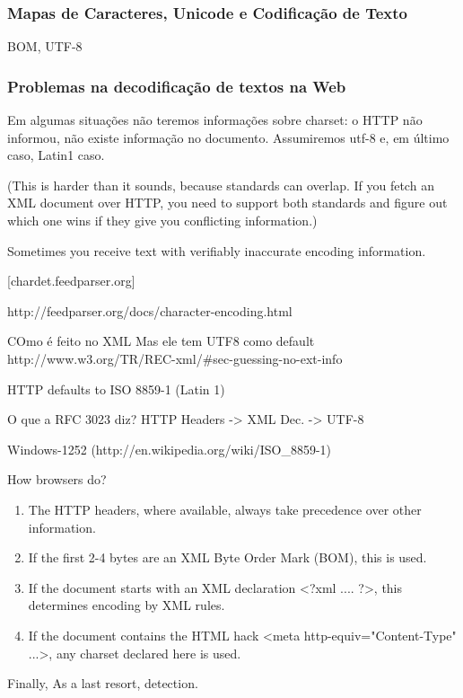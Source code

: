 \documentclass[10pt,twocolumn]{article}
\begin{document}
\subsubsection{Mapas de Caracteres, Unicode e Codificação de Texto}
BOM, UTF-8

\subsubsection{Problemas na decodificação de textos na Web}

Em algumas situações não teremos informações sobre charset: o HTTP não
informou, não existe informação no documento. Assumiremos utf-8 e, em
último caso, Latin1 caso.

    (This is harder than it sounds, because standards can overlap. If
    you fetch an XML document over HTTP, you need to support both
    standards and figure out which one wins if they give you conflicting
    information.)
    
    Sometimes you receive text with verifiably inaccurate encoding information.
    
    [chardet.feedparser.org]


http://feedparser.org/docs/character-encoding.html

    COmo é feito no XML
        Mas ele tem UTF8 como default
        http://www.w3.org/TR/REC-xml/\#sec-guessing-no-ext-info

    HTTP defaults to ISO 8859-1 (Latin 1)

    O que a RFC 3023 diz? HTTP  Headers -> XML Dec. -> UTF-8


Windows-1252 (http://en.wikipedia.org/wiki/ISO\_8859-1)

How browsers do?

\begin{enumerate}
\item The HTTP headers, where available, always take precedence over other information.
\item  If the first 2-4 bytes are an XML Byte Order Mark (BOM), this is used.
\item  If the document starts with an XML declaration <?xml .... ?>, this determines encoding by XML rules.
 \item If the document contains the HTML hack <meta http-equiv="Content-Type" ...>, any charset declared here is used.
\end{enumerate}

Finally, As a last resort, detection.
\end{document}
